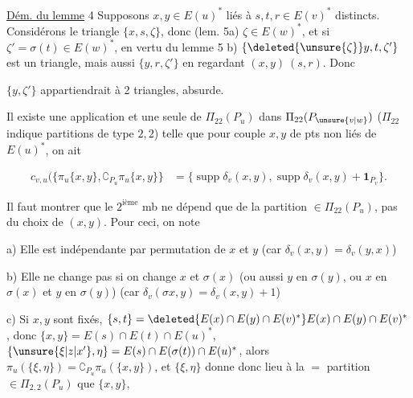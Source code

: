 \uline{Dém. du lemme} 4 Supposons $x,y\in E(u)^*$  liés à $s,t,r\in E(v)^*$ distincts. Considérons le triangle $\{x,s,\zeta\}$, donc (lem. 5a) $\zeta\in E(w)^*$, et si $\zeta'=\sigma(t)\in E(w)^*$, en vertu du lemme 5 b)  $\{\deleted{\unsure{\zeta}}y,t,\zeta'\}$ est un triangle, mais aussi $\{y,r,\zeta'\}$ en regardant $(x,y)\ (s,r)$. Donc


$\{y,\zeta'\}$ appartiendrait à 2 triangles, absurde.

 Il existe une application  et une seule de $\Pi_{22}(P_u)$ dans $\Pi_{22}(P_{\unsure{v|w}})$ ($\Pi_{22}$ indique partitions de type $2,2$) telle que pour    couple $x,y$ de pts non liés de $E(u)^*$,  on ait


\[
\begin{aligned}
c_{v,u}(\{\pi_u\{x,y\},\complement_{P_u}\pi_u\{x,y\}\}
&=\{\operatorname{supp}\delta_v(x,y),\operatorname{supp}\delta_v(x,y)+\mathbf{1}_{P_v}\}.
\end{aligned}
\]

Il faut montrer que le $2^{\mathrm{ième}}$ mb ne dépend que de la partition $\in\Pi_{22}(P_u)$, pas du choix de $(x,y)$. Pour ceci, on note

a) Elle est indépendante par permutation de $x$ et $y$  (car $\delta_v(x,y)=\delta_v(y,x)$)

b) Elle ne change pas si on change $x$ et $\sigma(x)$ (ou aussi $y$ en $\sigma(y)$, ou $x$ en $\sigma(x)$ et $y$ en $\sigma(y)$) (car $\delta_v(\sigma x,y)=\delta_v(x,y)+1$)

c) Si $x,y$ sont fixés,   $\{s,t\}=\deleted{E(x)\cap E(y)\cap E(v)^*}E(x)\cap E(y)\cap E(v)^*$, donc  $\{x,y\}=E(s)\cap E(t)\cap E(u)^*$,  $\{\unsure{\xi|z|x'},\eta\}=E(s)\cap E(\sigma(t))\cap E(u)^*$, alors $\pi_u(\{\xi,\eta\})=\complement_{P_u}\pi_u(\{x,y\})$,  et $\{\xi,\eta\}$ donne donc lieu à la $=$ partition $\in\Pi_{2,2}(P_u)$ que $\{x,y\}$,

